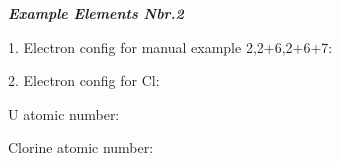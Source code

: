 \documentclass[11pt]{article}
\begin{document}
\noindent
\textit{{\bfseries Example Elements Nbr.2}}\\




  1. Electron config for manual example 2,2+6,2+6+7: 
   \par

  2. Electron config for Cl:

  U atomic number:  \par
  Clorine atomic number:  \par
\end{document}
